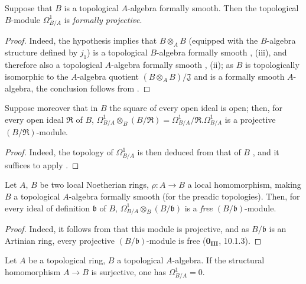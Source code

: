 \begin{theorem}[20.4.9]
\label{0.20.4.9}
Suppose that $B$ is a topological $A$-algebra formally smooth.
Then the topological $B$-module $\Omega^1_{B/A}$ is \emph{formally projective}.
\end{theorem}

\begin{proof}
Indeed, the hypothesis implies that $B\otimes_A B$ (equipped with the $B$-algebra structure defined by $j_1$) is a topological $B$-algebra formally smooth , (iii), and therefore also a topological $A$-algebra formally smooth , (ii); as $B$ is topologically isomorphic to the $A$-algebra quotient $(B\otimes_A B)/\mathfrak{J}$ and is a formally smooth $A$-algebra, the conclusion follows from .
\end{proof}

\begin{corollary}[20.4.10]
\label{0.20.4.10}
Suppose moreover that in $B$ the square of every open ideal is open; then, for every open ideal $\mathfrak{R}$ of $B$, $\Omega^1_{B/A}\otimes_B(B/\mathfrak{R})=\Omega^1_{B/A}/\mathfrak{R}.\Omega^1_{B/A}$ is a projective $(B/\mathfrak{R})$-module.
\end{corollary}

\begin{proof}
Indeed, the topology of $\Omega^1_{B/A}$ is then deduced from that of $B$ , and it suffices to apply .
\end{proof}

\begin{corollary}[20.4.11]
\label{0.20.4.11}
Let $A$, $B$ be two local Noetherian rings, $\rho:A\to B$ a local homomorphism, making $B$ a topological $A$-algebra formally smooth \textup{(}for the preadic topologies\textup{)}.
Then, for every ideal of definition $\mathfrak{b}$ of $B$, $\Omega^1_{B/A}\otimes_B(B/\mathfrak{b})$ is a \emph{free} $(B/\mathfrak{b})$-module.
\end{corollary}

\begin{proof}
Indeed, it follows from  that this module is projective, and as $B/\mathfrak{b}$ is an Artinian ring, every projective $(B/\mathfrak{b})$-module is free ($\mathbf{0_{III}}$, 10.1.3).
\end{proof}

\begin{proposition}[20.4.12]
\label{0.20.4.12}
Let $A$ be a topological ring, $B$ a topological $A$-algebra.
If the structural homomorphism $A\to B$ is surjective, one has $\Omega^1_{B/A}=0$.
\end{proposition}

